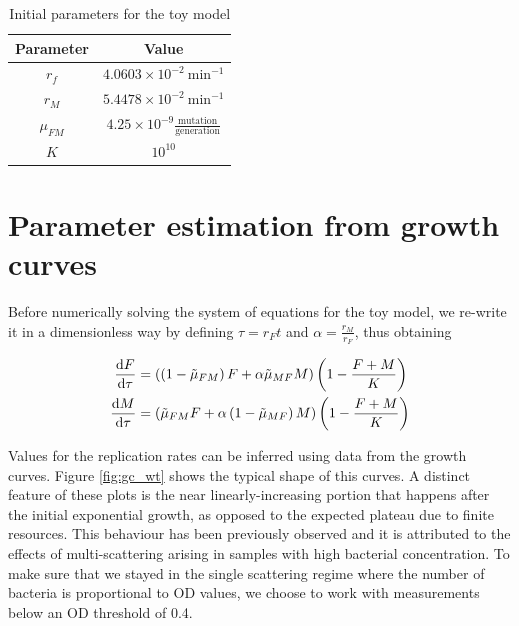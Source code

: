 \documentclass{article}
\begin{document}
\begin{table}[H]
    \centering
    \begin{tabular}{|c|c|}
        \hline
        Parameter & Value\\
         \hline
         $r_f$& $4.0603\times 10^{-2} \ \text{min}^{-1}$\\
         $r_M$& $5.4478\times 10^{-2} \ \text{min}^{-1}$\\
         $\mu_{FM}$ & $4.25\times 10^{-9}\frac{\text{mutation}}{\text{generation}}$\\
         $K$ & $10^{10}$\\
         \hline
    \end{tabular}
    \caption{Initial parameters for the toy model}
    \label{tab:initial_parameters_two_state_model}
\end{table}

\section{Parameter estimation from growth curves}


Before numerically solving the system of equations for the toy model, we re-write it in a dimensionless way by defining $\tau = r_F t$ and $\alpha = \frac{r_M}{r_F}$, thus obtaining  

\begin{subequations}\label{eqs:adimensional_two_state_model}
\begin{align}
\dv{F}{\tau} &= \left( \left(1 - \Tilde{\mu}_{FM}\right)F + \alpha \Tilde{\mu}_{MF} M\right) \left(1-\frac{F + M}{K}\right)\\
\dv{M}{\tau} &= \left( \Tilde{\mu}_{FM} F + \alpha\left(1 - \Tilde{\mu}_{MF}\right)M\right) \left(1-\frac{F + M}{K}\right)
\end{align}
\end{subequations}

Values for the replication rates can be inferred using data from the growth curves. Figure \ref{fig:gc_wt} shows the typical shape of this curves. A distinct feature of these plots is the near linearly-increasing portion that happens after the initial exponential growth, as opposed to the expected plateau due to finite resources. This behaviour has been previously observed \cite{stevenson_general_2016} and it is attributed to the effects of multi-scattering arising in samples with high bacterial concentration. To make sure that we stayed in the single scattering regime where the number of bacteria is proportional to OD values, we choose to work with measurements below an OD threshold of 0.4.
\end{document}
